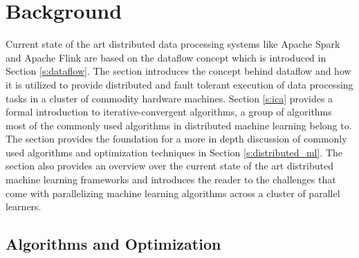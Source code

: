 \chapter{Background}
\label{c:background}
Current state of the art distributed data processing systems like Apache Spark and Apache Flink are based on the dataflow concept which is introduced in Section \ref{s:dataflow}.
The section introduces the concept behind dataflow and how it is utilized to provide distributed and fault tolerant execution of data processing tasks in a cluster of commodity hardware machines.
Section \ref{s:ica} provides a formal introduction to iterative-convergent algorithms, a group of algorithms most of the commonly used algorithms in distributed machine learning belong to.
The section provides the foundation for a more in depth discussion of commonly used algorithms and optimization techniques in Section \ref{s:distributed_ml}. The section also provides an overview over the current state of the art distributed machine learning frameworks and introduces the reader to the challenges that come with parallelizing machine learning algorithms across a cluster of parallel learners.


\section{Algorithms and Optimization}

